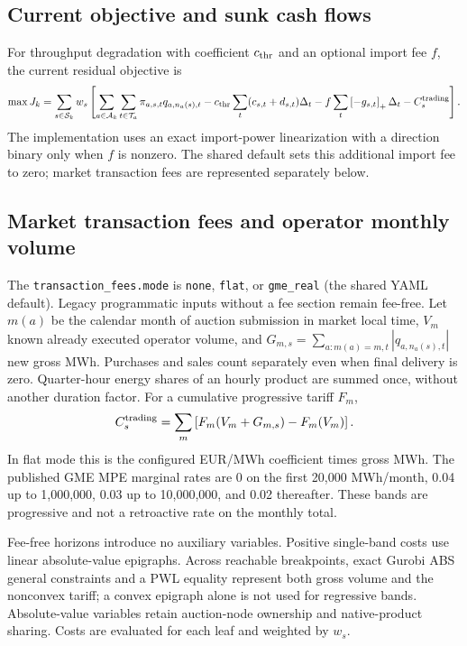 \documentclass[11pt,a4paper]{article}
\newcommand{\pos}[1]{\left[#1\right]_+}
\begin{document}
\subsection{Current objective and sunk cash flows}
For throughput degradation with coefficient $c_{\rm thr}$ and an optional import
fee $f$, the current residual objective is
\begin{equation}\label{eq:objective}
 \max J_k=\sum_{s\in\mathcal S_k}w_s\left[
 \sum_{a\in\mathcal A_k}\sum_{t\in\mathcal T_a}\pi_{a,s,t}q_{a,n_a(s),t}
 -c_{\rm thr}\sum_t(c_{s,t}+d_{s,t})\Delta_t
 -f\sum_t\pos{-g_{s,t}}\Delta_t-C^{\rm trading}_s\right].
\end{equation}
The implementation uses an exact import-power linearization with a direction
binary only when $f$ is nonzero. The shared default sets this additional import
fee to zero; market transaction fees are represented separately below.

\subsection{Market transaction fees and operator monthly volume}
The \texttt{transaction\_fees.mode} is \texttt{none},
\texttt{flat}, or \texttt{gme\_real} (the shared YAML default). Legacy programmatic
inputs without a fee section remain fee-free. Let $m(a)$ be the calendar month of auction
submission in market local time, $V_m$ known already executed operator volume,
and $G_{m,s}=\sum_{a:m(a)=m,t}|q_{a,n_a(s),t}|$ new gross MWh. Purchases and
sales count separately even when final delivery is zero. Quarter-hour energy
shares of an hourly product are summed once, without another duration factor.
For a cumulative progressive tariff $F_m$,
\begin{equation}
 C^{\rm trading}_s=\sum_m\left[F_m(V_m+G_{m,s})-F_m(V_m)\right].
\end{equation}
In flat mode this is the configured EUR/MWh coefficient times gross MWh.
The published GME MPE marginal rates are 0 on the first 20,000 MWh/month,
0.04 up to 1,000,000, 0.03 up to 10,000,000, and 0.02 thereafter.
These bands are progressive and not a retroactive rate on the monthly total.

Fee-free horizons introduce no auxiliary variables. Positive single-band costs
use linear absolute-value epigraphs. Across reachable breakpoints, exact Gurobi
ABS general constraints and a PWL equality represent both gross volume and the
nonconvex tariff; a convex epigraph alone is not used for regressive bands.
Absolute-value variables retain auction-node ownership and native-product
sharing. Costs are evaluated for each leaf and weighted by $w_s$.
\end{document}

